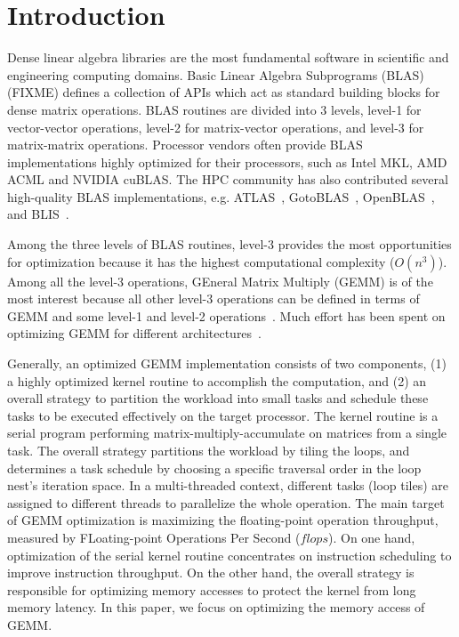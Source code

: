 \section{Introduction}\label{sec:intro}
Dense linear algebra libraries are the most fundamental software in
scientific and engineering computing domains.
Basic Linear Algebra Subprograms (BLAS) (FIXME) defines a collection
of APIs which act as standard building blocks for dense matrix operations.
BLAS routines are divided into 3 levels,
level-1 for vector-vector operations,
level-2 for matrix-vector operations,
and level-3 for matrix-matrix operations.
Processor vendors often provide BLAS implementations
highly optimized for their processors,
such as Intel MKL, AMD ACML and NVIDIA cuBLAS.
The HPC community has also contributed several high-quality
BLAS implementations, e.g. ATLAS~\cite{atlas},
GotoBLAS~\cite{gotoblas}, OpenBLAS~\cite{openblas},
and BLIS~\cite{blis,blisport}.

Among the three levels of BLAS routines, level-3 provides the most opportunities
for optimization because it has the highest computational complexity ($O(n^3)$).
Among all the level-3 operations, GEneral Matrix Multiply (GEMM) is
of the most interest because all other level-3 operations can be defined
in terms of GEMM and some level-1 and level-2 operations~\cite{gemmbased1}.
Much effort has been spent on optimizing GEMM for different
architectures~\cite{Liu2012,Wang2015,Volkov:2008,Cui11,blispar}.

Generally, an optimized GEMM implementation consists of two components,
(1) a highly optimized kernel routine to accomplish the computation, and
(2) an overall strategy to partition the workload into small tasks
and schedule these tasks to be executed effectively on the target processor.
The kernel routine is a serial program performing matrix-multiply-accumulate
on matrices from a single task.
The overall strategy partitions the workload by tiling the loops,
and determines a task schedule by choosing a specific traversal order
in the loop nest's iteration space.
In a multi-threaded context, different tasks (loop tiles) are assigned to
different threads to parallelize the whole operation.
The main target of GEMM optimization is maximizing the floating-point
operation throughput, measured by FLoating-point Operations Per Second ($flops$).
On one hand, optimization of the serial kernel routine concentrates on
instruction scheduling to improve instruction throughput.
On the other hand, the overall strategy is responsible for optimizing
memory accesses to protect the kernel from long memory latency.
In this paper, we focus on optimizing the memory access of GEMM.

